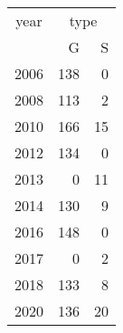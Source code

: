 \footnotesize\begin{tabular}[t]{lrr}
\toprule
\multicolumn{1}{c}{year} & \multicolumn{2}{c}{type} \\
\cmidrule(l{3pt}r{3pt}){1-1} \cmidrule(l{3pt}r{3pt}){2-3}
  & G & S\\
\midrule
2006 & 138 & 0\\
2008 & 113 & 2\\
2010 & 166 & 15\\
2012 & 134 & 0\\
2013 & 0 & 11\\
2014 & 130 & 9\\
2016 & 148 & 0\\
2017 & 0 & 2\\
2018 & 133 & 8\\
2020 & 136 & 20\\
\bottomrule
\end{tabular}
